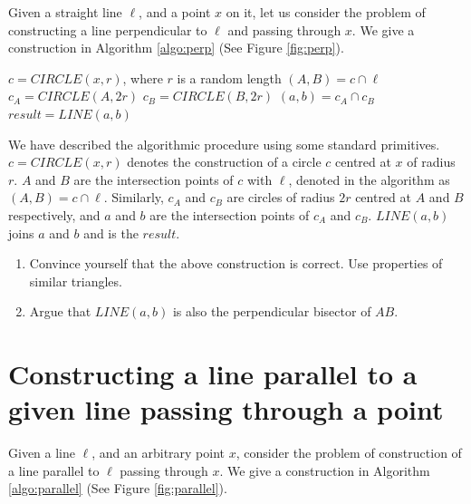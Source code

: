 Given a straight line $\ell$, and a point $x$ on it, let us consider the problem of constructing a line perpendicular to $\ell$ and passing through $x$. We give a construction  in Algorithm \ref{algo:perp}  (See Figure \ref{fig:perp}).
\begin{algorithm}
\begin{algorithmic}[1]
\State $c = CIRCLE(x,r)$, where $r$ is a random length
\State $(A,B) = c \cap \ell$  
\State $c_A = CIRCLE(A,2r)$
\State $c_B = CIRCLE(B,2r)$
\State $(a,b) = c_A \cap c_B$
\State $result = LINE(a,b)$
\EndProcedure
\end{algorithmic}
\caption{Constructing a line perpendicular to a given line  passing through a point}
\label{algo:perp}
\end{algorithm}

We have described the algorithmic procedure using some standard primitives. $c = CIRCLE(x,r)$ denotes the construction of a circle $c$  centred at $x$ of radius $r$. $A$ and $B$ are the intersection points of $c$ with $\ell$, denoted in the algorithm as $(A,B) = c \cap \ell$. Similarly, $c_A$ and $c_B$ are circles of radius $2r$ centred at $A$ and $B$ respectively, and $a$ and $b$ are the intersection points of $c_A$ and $c_B$. $LINE(a,b)$ joins $a$ and $b$ and is the $result$.

\begin{exercise}
\begin{enumerate}
\item Convince yourself that the above construction is correct. Use properties of similar triangles.
\item Argue that $LINE(a,b)$ is also the perpendicular bisector of $AB$.
\end{enumerate}
\end{exercise}

\section{Constructing a line parallel to a given line  passing through a point}
\label{sec:parallel}
Given a line $\ell$, and an arbitrary point $x$, consider the problem of construction of a line parallel to $\ell$ passing through $x$. We give a construction  in Algorithm \ref{algo:parallel}  (See Figure \ref{fig:parallel}).

